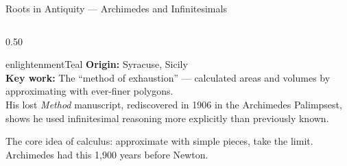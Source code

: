 \begin{frame}[shrink=9]{Roots in Antiquity --- Archimedes and Infinitesimals}

  \begin{columns}[T]
    \begin{column}{0.50\textwidth}
      \begin{personbox}{enlightenmentTeal}
        \small
        \textbf{Origin:} Syracuse, Sicily\\
        \textbf{Key work:} The ``method of exhaustion'' --- calculated areas and
        volumes by approximating with ever-finer polygons.\\[3pt]
        His lost \emph{Method} manuscript, rediscovered in 1906 in the
        Archimedes Palimpsest, shows he used infinitesimal reasoning
        more explicitly than previously known.
      \end{personbox}

      \vspace{0.5em}
      \begin{insightbox}
        The core idea of calculus: approximate with simple pieces, take the limit.
        Archimedes had this 1,900 years before Newton.
      \end{insightbox}
    \end{column}


\end{columns}
\end{frame}
